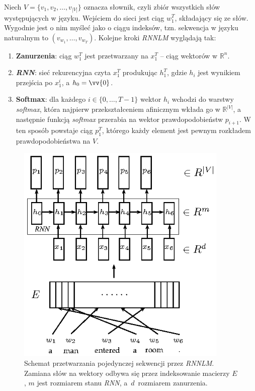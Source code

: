 Niech $V = \lbrace v_1, v_2, \dots, v_{|V|} \rbrace$ oznacza słownik, czyli zbiór wszystkich słów występujących w języku. Wejściem do sieci jest ciąg $w_1^T$, składający się ze słów. Wygodnie jest o nim myśleć jako o ciągu indeksów, tzn. sekwencja w języku naturalnym to $(v_{w_1}, \dots, v_{w_T})$. Kolejne kroki \textit{RNNLM} wyglądają tak:
\begin{enumerate}
    \item \textbf{Zanurzenia}: ciąg $w_1^T$ jest przetwarzany na $x_1^T$ -- ciąg wektorów w $\mathbb{R}^n$.
    \item \textbf{\textit{RNN}}: sieć rekurencyjna czyta $x_1^T$ produkując $h_1^T$, gdzie $h_i$ jest wynikiem przejścia po $x_1^i$, a $h_0 = \vv{0}$.
    \item \textbf{Softmax}: dla każdego $i \in \{0,\dots,T-1\}$ wektor $h_i$ wchodzi do warstwy \textit{softmax}, która najpierw przekształceniem afinicznym wkłada go w $\mathbb{R}^{|V|}$, a następnie funkcją \textit{softmax} przerabia na wektor prawdopodobieństw $p_{i+1}$. W ten sposób powstaje ciąg $p_1^T$, którego każdy element jest pewnym rozkładem prawdopodobieństwa na $V$.
\end{enumerate}

\begin{figure}[H]
  \centering
    \hspace*{2cm}\includegraphics[width=0.9\textwidth]{chapter2/img/rnnlm.eps}
  \caption{\small{Schemat przetwarzania pojedynczej sekwencji przez \textit{RNNLM}. Zamiana słów na wektory odbywa się przez indeksowanie macierzy $E$, $m$ jest rozmiarem stanu \textit{RNN}, a~$d$~rozmiarem zanurzenia.}}
\end{figure}

